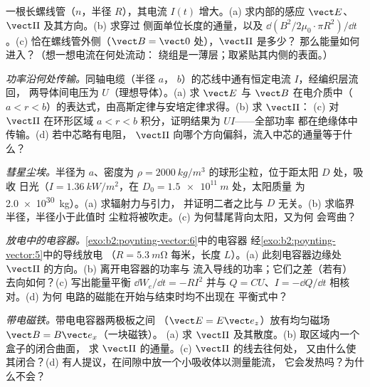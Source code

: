\begin{exercise}[$\star\star$]\label{exo:b2:poynting-vector:7}
一根长螺线管（$n$，半径 $R$），其电流 $I(t)$ 增大。(a)
求内部的感应 $\vect E$、$\vect\Pi$ 及其方向。(b) 求穿过
侧面单位长度的通量，以及 $\dd(B^2/2\mu_0\cdot\pi R^2)/\dd t$。(c)
恰在螺线管外侧（$\vect B = \vect 0$ 处），$\vect\Pi$ 是多少？
那么能量如何进入？（想一想电流在何处流动：
绕组是一薄层；取紧贴其内侧的表面。）
\end{exercise}

\begin{exercise}[$\star\star$]\label{exo:b2:poynting-vector:8}
\emph{功率沿何处传输。}同轴电缆（半径 $a$，
$b$）的芯线中通有恒定电流 $I$，经编织层流回，
两导体间电压为 $U$（理想导体）。(a) 求 $\vect E$ 与 $\vect B$
在电介质中（$a < r < b$）的表达式，由高斯定律与安培定律求得。(b) 求 $\vect\Pi$：
(c) 对 $\vect\Pi$ 在环形区域 $a < r
< b$ 积分，证明结果为 $UI$——全部功率
都在绝缘体中传输。(d) 若中芯略有电阻，
$\vect\Pi$ 向哪个方向偏斜，流入中芯的通量等于什么？
\end{exercise}

\begin{exercise}[$\star\star$]\label{exo:b2:poynting-vector:9}
\emph{彗星尘埃。}半径为 $a$、密度为
$\rho = \qty{2000}{kg/m^3}$ 的球形尘粒，位于距太阳 $D$ 处，吸收
日光（$I = \qty{1.36}{kW/m^2}$，在 $D_0 = \qty{1.5e11}{m}$ 处，太阳质量
为 \qty{2.0e30}{kg}）。(a) 求辐射力与引力，
并证明二者之比与 $D$ 无关。(b) 求临界半径，半径小于此值时
尘粒将被吹走。(c) 为何彗尾背向太阳，又为何
会弯曲？
\end{exercise}

\begin{exercise}[$\star\star\star$]\label{exo:b2:poynting-vector:10}
\emph{放电中的电容器。}\cref{exo:b2:poynting-vector:6}中的电容器
经\cref{exo:b2:poynting-vector:5}中的导线放电
（$R = \qty{5.3}{m\ohm}$ 每米，长度
$L$）。(a) 此刻电容器边缘处 $\vect\Pi$ 的方向。(b) 离开电容器的功率与
流入导线的功率；它们之差（若有）
去向如何？(c) 写出能量平衡 $\dd W_e/\dd t = -RI^2$
并与 $Q = CU$、$I = -\dd Q/\dd t$ 相核对。(d) 为何
电路的磁能在开始与结束时均不出现在
平衡式中？
\end{exercise}

\begin{exercise}[$\star\star\star$]\label{exo:b2:poynting-vector:11}
\emph{带电磁铁。}带电电容器两极板之间
（$\vect E = E\vect e_z$）放有均匀磁场 $\vect B = B\vect e_x$（一块磁铁）。
(a) 求 $\vect\Pi$ 及其散度。(b) 取区域内一个盒子的闭合曲面，
求 $\vect\Pi$ 的通量。(c) $\vect\Pi$ 的线去往何处，
又由什么使其闭合？(d) 有人提议，在间隙中放一个小吸收体以测量能流，
它会发热吗？为什么不会？
\end{exercise}

